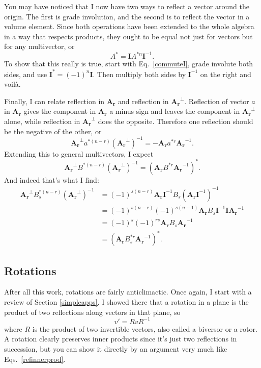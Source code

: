 \documentclass{utarticle}
\newcommand{\bl}[1]{\ensuremath{\bm{#1}}}
\newcommand{\I}{\bl{I}}
\newcommand{\grinv}[2][]{\ensuremath{#2^{*#1}}}
\newcommand{\dual}[1]{\ensuremath{#1^\perp}}
\begin{document}
You may have noticed that I now have two ways to reflect a vector around the origin.  The first
is grade involution, and the second is to reflect the vector in a volume element.  Since
both operations have been extended to the whole algebra in a way that respects 
products, they ought to be equal not just for vectors but for any multivector, or 
\begin{equation} 
\grinv{A} = \I \grinv[n]{A} \I^{-1}.
\label{explicitspaceref} 
\end{equation}
To show that this really is true, start with Eq.~\eqref{commuteI}, grade involute both sides,
and use $\grinv{\I}=(-1)^n \I$.  Then multiply both sides by $\I^{-1}$ on the right and voil\`{a}.

Finally, I can relate reflection in \bl{A_r} and reflection in \dual{\bl{A_r}}.  Reflection of vector 
$a$ in \bl{A_r} gives the component in \bl{A_r} a minus sign and leaves the component in 
\dual{\bl{A_r}} alone, while reflection in \dual{\bl{A_r}} does the opposite.  Therefore one reflection
should be the negative of the other, or
\begin{equation} 
\dual{\bl{A_r}} \grinv[(n-r)]{a} (\dual{\bl{A_r}})^{-1} = -\bl{A_r} \grinv[r]{a} \bl{A_r}^{-1}.
\end{equation}
Extending this to general multivectors, I expect
\begin{equation} 
\dual{\bl{A_r}} \grinv[(n-r)]{B} (\dual{\bl{A_r}})^{-1} = \grinv{(\bl{A_r} \grinv[r]{B} \bl{A_r}^{-1})}.
\end{equation}
And indeed that's what I find:
\begin{align}
\dual{\bl{A_r}} \grinv[(n-r)]{B_s} (\dual{\bl{A_r}})^{-1} 
     & = (-1)^{s(n-r)} \bl{A_r} \I^{-1} B_s (\bl{A_r} \I^{-1})^{-1} \nonumber \\
     & = (-1)^{s(n-r)} (-1)^{s(n-1)} \bl{A_r} B_s \I^{-1} \I \bl{A_r}^{-1} \nonumber \\
     & = (-1)^s (-1)^{rs} \bl{A_r} B_s \bl{A_r}^{-1} \nonumber \\
     & = \grinv{(\bl{A_r} \grinv[r]{B_s} \bl{A_r}^{-1})}.
\end{align}

\subsection{Rotations}
\label{rot}

After all this work, rotations are fairly anticlimactic.  Once again, I start with a review 
of Section \ref{simpleapps}.  I showed there that a rotation in a plane is the product of two 
reflections along vectors in that plane, so
\begin{equation} v' = R v R^{-1} \end{equation}
where $R$ is the product of two invertible vectors, also called a biversor or a rotor.  A rotation
clearly preserves inner products since it's just two reflections in succession, but you
can show it directly by an argument very much like Eqs.~\eqref{refinnerprod}.
\end{document}
